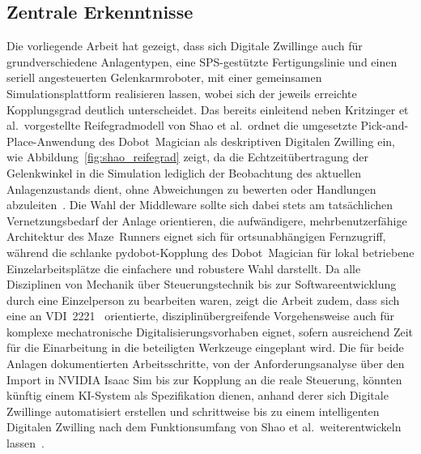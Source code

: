 \documentclass[conference]{IEEEtran}
\begin{document}
\subsection{Zentrale Erkenntnisse}
Die vorliegende Arbeit hat gezeigt, dass sich Digitale Zwillinge auch für grundverschiedene Anlagentypen, eine SPS-gestützte Fertigungslinie und einen seriell angesteuerten Gelenkarmroboter, mit einer gemeinsamen Simulationsplattform realisieren lassen, wobei sich der jeweils erreichte Kopplungsgrad deutlich unterscheidet.
Das bereits einleitend neben Kritzinger et al.\ vorgestellte Reifegradmodell von Shao et al.\ ordnet die umgesetzte Pick-and-Place-Anwendung des Dobot~Magician als deskriptiven Digitalen Zwilling ein, wie Abbildung~\ref{fig:shao_reifegrad} zeigt, da die Echtzeitübertragung der Gelenkwinkel in die Simulation lediglich der Beobachtung des aktuellen Anlagenzustands dient, ohne Abweichungen zu bewerten oder Handlungen abzuleiten~\cite{shao2023standardized}.
Die Wahl der Middleware sollte sich dabei stets am tatsächlichen Vernetzungsbedarf der Anlage orientieren, die aufwändigere, mehrbenutzerfähige Architektur des Maze~Runners eignet sich für ortsunabhängigen Fernzugriff, während die schlanke pydobot-Kopplung des Dobot~Magician für lokal betriebene Einzelarbeitsplätze die einfachere und robustere Wahl darstellt.
Da alle Disziplinen von Mechanik über Steuerungstechnik bis zur Softwareentwicklung durch eine Einzelperson zu bearbeiten waren, zeigt die Arbeit zudem, dass sich eine an VDI~2221~\cite{vdi_konstruktionsmethodik} orientierte, disziplinübergreifende Vorgehensweise auch für komplexe mechatronische Digitalisierungsvorhaben eignet, sofern ausreichend Zeit für die Einarbeitung in die beteiligten Werkzeuge eingeplant wird.
Die für beide Anlagen dokumentierten Arbeitsschritte, von der Anforderungsanalyse über den Import in NVIDIA Isaac Sim bis zur Kopplung an die reale Steuerung, könnten künftig einem KI-System als Spezifikation dienen, anhand derer sich Digitale Zwillinge automatisiert erstellen und schrittweise bis zu einem intelligenten Digitalen Zwilling nach dem Funktionsumfang von Shao et al.\ weiterentwickeln lassen~\cite{shao2023standardized}.
\end{document}
